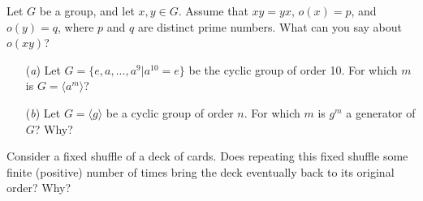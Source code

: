 \documentclass[12pt,letterpaper,boxed]{hmcpset}
\begin{document}

\begin{problem}[2.3.16]
Let $G$ be a group, and let $x,y \in G$. Assume that $xy = yx$, $o(x) = p$, and $o(y) = q$, where $p$ and $q$ are distinct prime numbers. What can you say about $o(xy)$?
\end{problem}

\begin{solution}

\end{solution}

\clearpage

\begin{problem}[2.3.19]
\begin{itemize}
  \item[(\textit{a})] Let $G = \{e, a,...,a^9 \vert a^{10} = e\} $ be the cyclic group of order 10. For which $m$ is $G = \langle a^m \rangle$?
  
  \item[(\textit{b})] Let $G = \langle g \rangle$ be a cyclic group of order $n$.  For which $m$ is $g^m$ a generator of $G$? Why?
\end{itemize}
\end{problem}

\begin{solution}
\end{solution}

\clearpage

\begin{problem}[2.3.21]
Consider a fixed shuffle of a deck of cards. Does repeating this fixed shuffle some finite (positive) number of times bring the deck eventually back to its original order? Why? 
\end{problem}

\begin{solution}
\end{solution}

\clearpage
\end{document}
